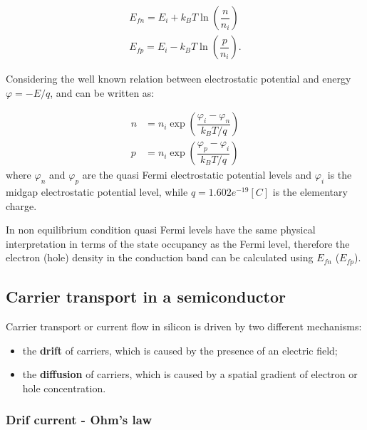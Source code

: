 \begin{align}
E_{fn} = E_i + k_B T \ln\left( \dfrac{n}{n_i} \right) \label{eq: quasi fermi level electron} \\
E_{fp} = E_i - k_B T \ln\left( \dfrac{p}{n_i} \right). \label{eq: quasi fermi level hole}
\end{align}


Considering the well known relation between electrostatic potential and energy $\varphi = -E/q$,  and  can be written as:

\begin{align}
n & = n_i \exp\left(\dfrac{\varphi_{i}-\varphi_n}{k_BT/q}\right) \label{eq: non eq n density mb}\\
p & = n_i \exp\left(\dfrac{\varphi_p-\varphi_{i}}{k_BT/q}\right)  \label{eq: non eq p density mb}
\end{align}
where $\varphi_n$ and $\varphi_p$ are the quasi Fermi electrostatic potential levels and $\varphi_i$ is the midgap electrostatic potential level, while $q=1.602e^{-19}[C]$ is the elementary charge. 

\begin{Osservazione}
In non equilibrium condition quasi Fermi levels have the same physical interpretation in terms of the state occupancy as the Fermi level, therefore the electron (hole) density in the conduction band can be calculated using $E_{fn}$ ($E_{fp}$).
\end{Osservazione}

\subsection{Carrier transport in a semiconductor}
\label{sec: carrier transport}

Carrier transport or current flow in silicon is driven by two different mechanisms:
\begin{itemize}
\item the \textbf{drift} of carriers, which is caused by the presence of an electric field;
\item the \textbf{diffusion} of carriers, which is caused by a spatial gradient of electron or hole concentration.
\end{itemize}

\subsubsection{Drif current - Ohm's law}

